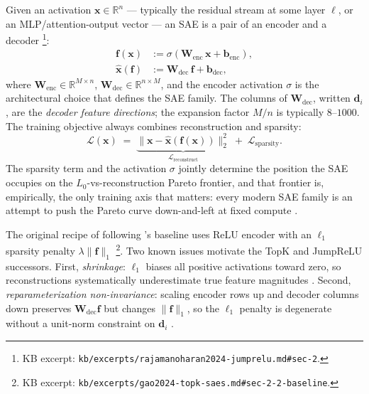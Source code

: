 Given an activation $\mathbf{x} \in \mathbb{R}^n$ — typically the
residual stream at some layer $\ell$, or an MLP/attention-output vector
— an SAE is a pair of an encoder and a decoder
\citep[\S 2, Eq.~1--2]{rajamanoharan2024-jumprelu}\footnote{KB excerpt:
\texttt{kb/excerpts/rajamanoharan2024-jumprelu.md\#sec-2}.}:
\begin{align}
  \mathbf{f}(\mathbf{x}) &:= \sigma\!\left(\mathbf{W}_{\text{enc}}\,\mathbf{x} + \mathbf{b}_{\text{enc}}\right),
  \label{eq:sae-encoder}\\
  \hat{\mathbf{x}}(\mathbf{f}) &:= \mathbf{W}_{\text{dec}}\,\mathbf{f} + \mathbf{b}_{\text{dec}},
  \label{eq:sae-decoder}
\end{align}
where $\mathbf{W}_{\text{enc}} \in \mathbb{R}^{M \times n}$,
$\mathbf{W}_{\text{dec}} \in \mathbb{R}^{n \times M}$, and the encoder
activation $\sigma$ is the architectural choice that defines the SAE
family. The columns of $\mathbf{W}_{\text{dec}}$, written
$\mathbf{d}_i$, are the \emph{decoder feature directions}; the
expansion factor $M / n$ is typically $8$--$1000$. The training
objective always combines reconstruction and sparsity:
\begin{equation}
  \mathcal{L}(\mathbf{x})
  \;=\;
  \underbrace{\|\mathbf{x} - \hat{\mathbf{x}}(\mathbf{f}(\mathbf{x}))\|_2^2}_{\mathcal{L}_{\text{reconstruct}}}
  \;+\;
  \mathcal{L}_{\text{sparsity}}.
  \label{eq:sae-loss}
\end{equation}
The sparsity term and the activation $\sigma$ jointly determine the
position the SAE occupies on the $L_0$-vs-reconstruction Pareto
frontier, and that frontier is, empirically, the only training axis
that matters: every modern SAE family is an attempt to push the
Pareto curve down-and-left at fixed compute
\citep[\S 1]{rajamanoharan2024-jumprelu}.

The original recipe of \citet{templeton2024-scaling-monosemanticity}
following \citet{gao2024-topk-saes}'s baseline uses ReLU encoder with
an $\ell_1$ sparsity penalty $\lambda \|\mathbf{f}\|_1$
\citep[\S 2.2, Eq.~1]{gao2024-topk-saes}\footnote{KB excerpt:
\texttt{kb/excerpts/gao2024-topk-saes.md\#sec-2-2-baseline}.}. Two
known issues motivate the TopK and JumpReLU successors. First,
\emph{shrinkage}: $\ell_1$ biases all positive activations toward zero,
so reconstructions systematically underestimate true feature
magnitudes \citep[\S 2.3]{gao2024-topk-saes}. Second,
\emph{reparameterization non-invariance}: scaling encoder rows up and
decoder columns down preserves $\mathbf{W}_{\text{dec}}\mathbf{f}$ but
changes $\|\mathbf{f}\|_1$, so the $\ell_1$ penalty is degenerate
without a unit-norm constraint on $\mathbf{d}_i$
\citep[\S 3]{rajamanoharan2024-jumprelu}.

